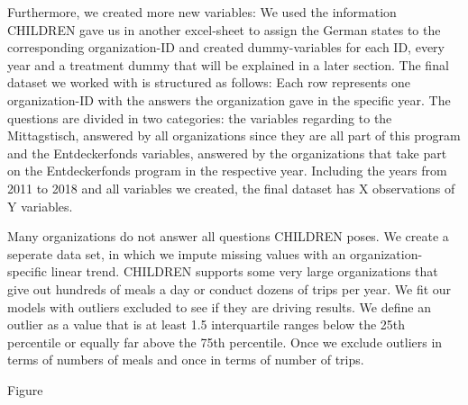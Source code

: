 \documentclass[12pt, a4paper, titlepage]{article}\usepackage[]{graphicx}\usepackage[]{color}
\begin{document}
Furthermore, we created more new variables: We used the information CHILDREN gave us in another excel-sheet to assign the German states to the corresponding organization-ID and created dummy-variables for each ID, every year and a treatment dummy that will be explained in a later section. 
The final dataset we worked with is structured as follows: Each row represents one organization-ID with the answers the organization gave in the specific year. The questions are divided in two categories: the variables regarding to the Mittagstisch, answered by all organizations since they are all part of this program and the Entdeckerfonds variables, answered by the organizations that take part on the Entdeckerfonds program in the respective year. Including the years from 2011 to 2018 and all variables we created, the final dataset has X observations of Y variables.

Many organizations do not answer all questions CHILDREN poses. We create a seperate data set, in which we impute missing values with an organization-specific linear trend. CHILDREN supports some very large organizations that give out hundreds of meals a day or conduct dozens of trips per year. We fit our models with outliers excluded to see if they are driving results. We define an outlier as a value that is at least 1.5 interquartile ranges below the 25th percentile or equally far above the 75th percentile. Once we exclude outliers in terms of numbers of meals and once in terms of number of trips.

Figure\\
\end{document}
